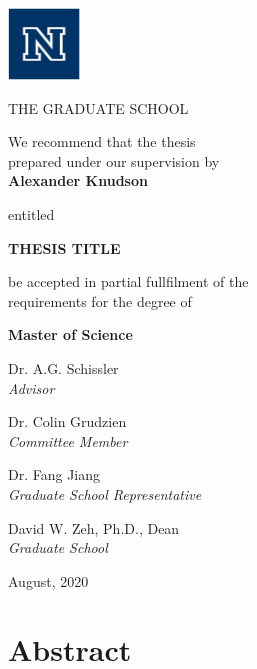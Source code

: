 \documentclass[11pt, oneside, openany]{scrbook}
\begin{document}
\newpage
\thispagestyle{empty}
\begin{center}

\includegraphics[width=0.75in, height=0.75in]{./figures/unr_logos/University Logo RGB_block_n_blue}

THE GRADUATE SCHOOL

\vspace{1em}
We recommend that the thesis \\
prepared under our supervision by\\

\vspace{1em}
\textbf{Alexander Knudson}

\vspace{1em}
entitled

\textbf{THESIS TITLE}

\vspace{2em}
be accepted in partial fullfilment of the \\
requirements for the degree of

\vspace{1em}
\textbf{Master of Science}

\vspace{1em}
Dr. A.G. Schissler \\
\textit{Advisor}

\vspace{1em}
Dr. Colin Grudzien\\
\textit{Committee Member}

\vspace{1em}
Dr. Fang Jiang \\
\textit{Graduate School Representative}

\vspace{1em}
David W. Zeh, Ph.D., Dean \\
\textit{Graduate School}

\vspace{1em}
August, 2020
\end{center}


\newpage
\setcounter{page}{1} %
\section*{Abstract}
\lipsum[1]
\end{document}
